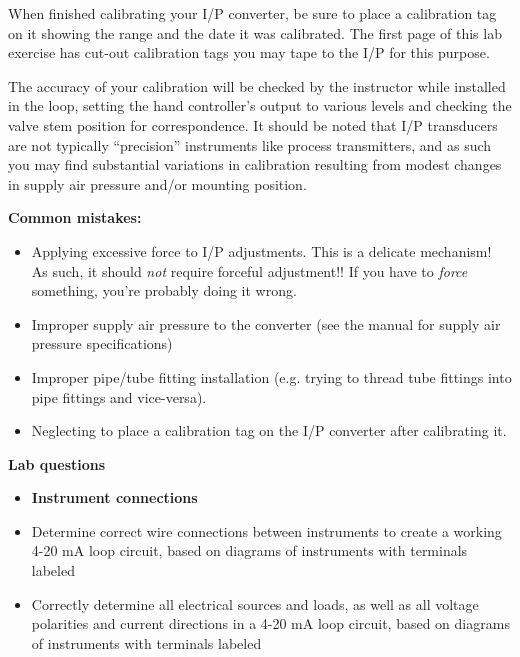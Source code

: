 When finished calibrating your I/P converter, be sure to place a calibration tag on it showing the range and the date it was calibrated.  The first page of this lab exercise has cut-out calibration tags you may tape to the I/P for this purpose.

The accuracy of your calibration will be checked by the instructor while installed in the loop, setting the hand controller's output to various levels and checking the valve stem position for correspondence.  It should be noted that I/P transducers are not typically ``precision'' instruments like process transmitters, and as such you may find substantial variations in calibration resulting from modest changes in supply air pressure and/or mounting position.

\vskip 10pt

{\bf Common mistakes:}

\begin{itemize}
\item{} Applying excessive force to I/P adjustments.  This is a delicate mechanism!  As such, it should {\it not} require forceful adjustment!!  If you have to {\it force} something, you're probably doing it wrong.
\item{} Improper supply air pressure to the converter (see the manual for supply air pressure specifications)
\item{} Improper pipe/tube fitting installation (e.g. trying to thread tube fittings into pipe fittings and vice-versa).
\item{} Neglecting to place a calibration tag on the I/P converter after calibrating it.
\end{itemize}








\vskip 10pt

\vfil \eject

\noindent
{\bf Lab questions}

\begin{itemize}
\item{} {\bf Instrument connections}
\item{} Determine correct wire connections between instruments to create a working 4-20 mA loop circuit, based on diagrams of instruments with terminals labeled
\item{} Correctly determine all electrical sources and loads, as well as all voltage polarities and current directions in a 4-20 mA loop circuit, based on diagrams of instruments with terminals labeled
\end{itemize}

